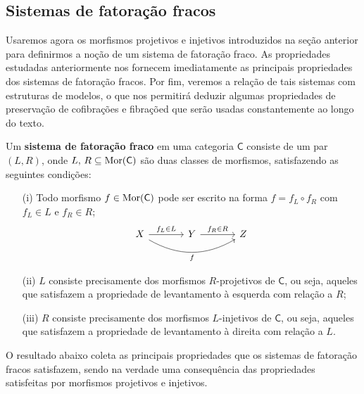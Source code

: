 \subsection{Sistemas de fatoração fracos}

Usaremos agora os morfismos projetivos e injetivos introduzidos na seção anterior para definirmos a noção de um sistema de fatoração fraco.
As propriedades estudadas anteriormente nos fornecem imediatamente as principais propriedades dos sistemas de fatoração fracos.
Por fim, veremos a relação de tais sistemas com estruturas de modelos, o que nos permitirá deduzir algumas propriedades de preservação de cofibrações e fibraçõed que serão usadas constantemente ao longo do texto.

\begin{defin}\label{defin:sistema_fatoracao_fraco}
  Um \textbf{sistema de fatoração fraco} em uma categoria $\mathsf{C}$ consiste de um par $(L,R)$, onde $L,\, R \subseteq \mathrm{Mor}(\mathsf{C})$ são duas classes de morfismos, satisfazendo as seguintes condições:
  \begin{enumerate}
  \item[(i)] Todo morfismo $f \in \mathrm{Mor}(\mathsf{C})$ pode ser escrito na forma $f = f_{L} \circ f_{R}$ com $f_{L} \in L$ e $f_{R} \in R$;
    \begin{equation}\label{eq:sistema_fatoracao_fraco_diag}
      \begin{tikzcd}[column sep=1.25cm]
        X
        \arrow[r, "f_{L} \in L"]
        \arrow[rr, bend right=30, "f" swap]
        & Y
        \arrow[r, "f_{R} \in R"]
        & Z
      \end{tikzcd}
    \end{equation}
    
  \item[(ii)] $L$ consiste precisamente dos morfismos $R$-projetivos de $\mathsf{C}$, ou seja, aqueles que satisfazem a propriedade de levantamento à esquerda com relação a $R$;
    
  \item[(iii)] $R$ consiste precisamente dos morfismos $L$-injetivos de $\mathsf{C}$, ou seja, aqueles que satisfazem a propriedade de levantamento à direita com relação a $L$.
  \end{enumerate}
\end{defin}

O resultado abaixo coleta as principais propriedades que os sistemas de fatoração fracos satisfazem, sendo na verdade uma consequência das propriedades satisfeitas por morfismos projetivos e injetivos.

